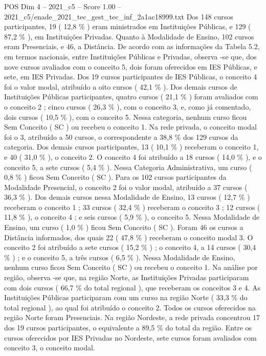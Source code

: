 \begin{textsample}{POS Dim 4 – 2021\_c5 – Score 1.00 – 2021\_c5/enade\_2021\_tec\_gest\_tec\_inf\_2a1ac18999.txt}
Dos 148 cursos participantes, 19 ( 12,8 \% ) eram ministrados em Instituições Públicas, e 129 ( 87,2 \% ), em Instituições Privadas.
Quanto à Modalidade de Ensino, 102 cursos eram Presenciais, e 46, a Distância.
De acordo com as informações da Tabela 5.2, em termos nacionais, entre Instituições Públicas e Privadas, observa -se que, dos nove cursos avaliados com o conceito 5, dois foram oferecidos em IES Públicas, e sete, em IES Privadas.
Dos 19 cursos participantes de IES Públicas, o conceito 4 foi o valor modal, atribuído a oito cursos ( 42,1 \% ).
Dos demais cursos de Instituições Públicas participantes, quatro cursos ( 21,1 \% ) foram avaliados com o conceito 2 ; cinco cursos ( 26,3 \% ), com o conceito 3, e, como já comentado, dois cursos ( 10,5 \% ), com o conceito 5.
Nessa categoria, nenhum curso ficou Sem Conceito ( SC ) ou recebeu o conceito 1.
Na rede privada, o conceito modal foi o 3, atribuído a 50 cursos, o correspondente a 38,8 \% dos 129 cursos da categoria.
Dos demais cursos participantes, 13 ( 10,1 \% ) receberam o conceito 1, e 40 ( 31,0 \% ), o conceito 2.
O conceito 4 foi atribuído a 18 cursos ( 14,0 \% ), e o conceito 5, a sete cursos ( 5,4 \% ).
Nessa Categoria Administrativa, um curso ( 0,8 \% ) ficou Sem Conceito ( SC ).
Para os 102 cursos participantes da Modalidade Presencial, o conceito 2 foi o valor modal, atribuído a 37 cursos ( 36,3 \% ).
Dos demais cursos nessa Modalidade de Ensino, 13 cursos ( 12,7 \% ) receberam o conceito 1 ; 33 cursos ( 32,4 \% ) receberam o conceito 3 ; 12 cursos ( 11,8 \% ), o conceito 4 ; e seis cursos ( 5,9 \% ), o conceito 5.
Nessa Modalidade de Ensino, um curso ( 1,0 \% ) ficou Sem Conceito ( SC ).
Foram 46 os cursos a Distância informados, dos quais 22 ( 47,8 \% ) receberam o conceito modal 3.
O conceito 2 foi atribuído a sete cursos ( 15,2 \% ) ; o conceito 4, a 14 cursos ( 30,4 \% ) ; e o conceito 5, a três cursos ( 6,5 \% ).
Nessa Modalidade de Ensino, nenhum curso ficou Sem Conceito ( SC ) ou recebeu o conceito 1.
Na análise por região, observa -se que, na região Norte, as Instituições Privadas participaram com dois cursos ( 66,7 \% do total regional ), que receberam os conceitos 3 e 4.
As Instituições Públicas participaram com um curso na região Norte ( 33,3 \% do total regional ), ao qual foi atribuído o conceito 2.
Todos os cursos oferecidos na região Norte foram Presenciais.
Na região Nordeste, a rede privada concentrou 17 dos 19 cursos participantes, o equivalente a 89,5 \% do total da região.
Entre os cursos oferecidos por IES Privadas no Nordeste, sete cursos foram avaliados com conceito 3, o conceito modal.

\end{textsample}
